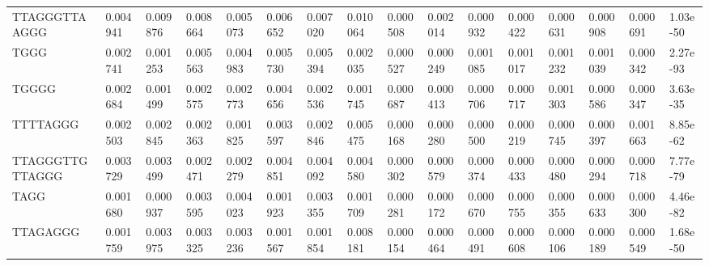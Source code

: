 \begin{samepage}
\begin{table}[h!]
\begin{tabular}{llllllllllllllll}
TTAGGGTTAAGGG     &  0.004941                                          &  0.009876                            &  0.008664                 &  0.005073        &  0.006652        &  0.007020        &  0.010064        &  0.000508        &  0.002014        &  0.000932        &  0.000422        &  0.000631        &  0.000908        &  0.000691        &  1.03e-50 \\
TGGG              &  0.002741                                          &  0.001253                            &  0.005563                 &  0.004983        &  0.005730        &  0.005394        &  0.002035        &  0.000527        &  0.000249        &  0.001085        &  0.001017        &  0.001232        &  0.001039        &  0.000342        &  2.27e-93 \\
TGGGG             &  0.002684                                          &  0.001499                            &  0.002575                 &  0.002773        &  0.004656        &  0.002536        &  0.001745        &  0.000687        &  0.000413        &  0.000706        &  0.000717        &  0.001303        &  0.000586        &  0.000347        &  3.63e-35 \\
TTTTAGGG          &  0.002503                                          &  0.002845                            &  0.002363                 &  0.001825        &  0.003597        &  0.002846        &  0.005475        &  0.000168        &  0.000280        &  0.000500        &  0.000219        &  0.000745        &  0.000397        &  0.001663        &  8.85e-62 \\
TTAGGGTTGTTAGGG   &  0.003729                                          &  0.003499                            &  0.002471                 &  0.002279        &  0.004851        &  0.004092        &  0.004580        &  0.000302        &  0.000579        &  0.000374        &  0.000433        &  0.000480        &  0.000294        &  0.000718        &  7.77e-79 \\
TAGG              &  0.001680                                          &  0.000937                            &  0.003595                 &  0.004023        &  0.001923        &  0.003355        &  0.001709        &  0.000281        &  0.000172        &  0.000670        &  0.000755        &  0.000355        &  0.000633        &  0.000300        &  4.46e-82 \\
TTAGAGGG          &  0.001759                                          &  0.003975                            &  0.003325                 &  0.003236        &  0.001567        &  0.001854        &  0.008181        &  0.000154        &  0.000464        &  0.000491        &  0.000608        &  0.000106        &  0.000189        &  0.000549        &  1.68e-50 \\

\end{tabular}
\end{table}
\end{samepage}
